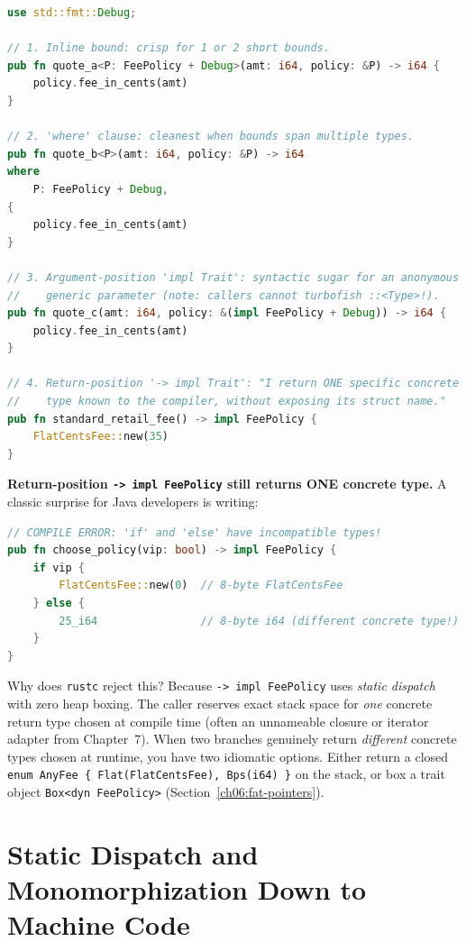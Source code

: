 \begin{lstlisting}[language=Rust, caption={Equivalent trait bound spellings, plus return-position impl Trait.}]
use std::fmt::Debug;

// 1. Inline bound: crisp for 1 or 2 short bounds.
pub fn quote_a<P: FeePolicy + Debug>(amt: i64, policy: &P) -> i64 {
    policy.fee_in_cents(amt)
}

// 2. 'where' clause: cleanest when bounds span multiple types.
pub fn quote_b<P>(amt: i64, policy: &P) -> i64
where
    P: FeePolicy + Debug,
{
    policy.fee_in_cents(amt)
}

// 3. Argument-position 'impl Trait': syntactic sugar for an anonymous
//    generic parameter (note: callers cannot turbofish ::<Type>!).
pub fn quote_c(amt: i64, policy: &(impl FeePolicy + Debug)) -> i64 {
    policy.fee_in_cents(amt)
}

// 4. Return-position '-> impl Trait': "I return ONE specific concrete
//    type known to the compiler, without exposing its struct name."
pub fn standard_retail_fee() -> impl FeePolicy {
    FlatCentsFee::new(35)
}
\end{lstlisting}

\begin{trapbox}
\textbf{Return-position \texttt{-> impl FeePolicy} still returns ONE concrete type.} A classic surprise for Java developers is writing:
\begin{lstlisting}[language=Rust]
// COMPILE ERROR: 'if' and 'else' have incompatible types!
pub fn choose_policy(vip: bool) -> impl FeePolicy {
    if vip {
        FlatCentsFee::new(0)  // 8-byte FlatCentsFee
    } else {
        25_i64                // 8-byte i64 (different concrete type!)
    }
}
\end{lstlisting}
Why does \texttt{rustc} reject this? Because \texttt{-> impl FeePolicy} uses \emph{static dispatch} with zero heap boxing. The caller reserves exact stack space for \emph{one} concrete return type chosen at compile time (often an unnameable closure or iterator adapter from Chapter~7). When two branches genuinely return \emph{different} concrete types chosen at runtime, you have two idiomatic options. Either return a closed \texttt{enum AnyFee \{ Flat(FlatCentsFee), Bps(i64) \}} on the stack, or box a trait object \texttt{Box<dyn FeePolicy>} (Section~\ref{ch06:fat-pointers}).
\end{trapbox}

\section{Static Dispatch and Monomorphization Down to Machine Code}
\label{ch06:monomorphization}

